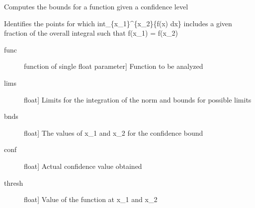 \documentclass[letterpaper,10pt,english]{sphinxmanual}
\begin{document}
\begin{fulllineitems}
\label{\detokenize{infrapy.location:infrapy.location.bisl.find_confidence}}
Computes the bounds for a function given a confidence level

Identifies the points for which int\_\{x\_1\}\textasciicircum{}\{x\_2\}\{f(x) dx\} includes a given
fraction of the overall integral such that f(x\_1) = f(x\_2)
\begin{description}
\item[{func}] \leavevmode{[}function of single float parameter{]}
Function to be analyzed

\item[{lims}] \leavevmode{[}float{]}
Limits for the integration of the norm and bounds for possible limits

\end{description}
\begin{description}
\item[{bnds}] \leavevmode{[}float{]}
The values of x\_1 and x\_2 for the confidence bound

\item[{conf}] \leavevmode{[}float{]}
Actual confidence value obtained

\item[{thresh}] \leavevmode{[}float{]}
Value of the function at x\_1 and x\_2

\end{description}

\end{fulllineitems}

\end{document}
